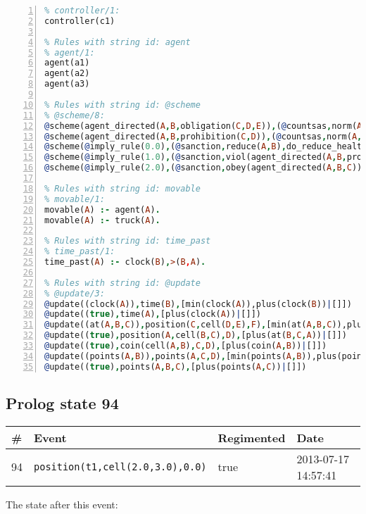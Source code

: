 \documentclass[11pt]{article}\usepackage[utf8]{inputenc}\usepackage{geometry}
\begin{document}
\begin{lstlisting}[language=Prolog, numbers=left]
% Rules with string id: controller
% controller/1:
controller(c1)

% Rules with string id: agent
% agent/1:
agent(a1)
agent(a2)
agent(a3)

% Rules with string id: @scheme
% @scheme/8:
@scheme(agent_directed(A,B,obligation(C,D,E)),(@countsas,norm(A,B,F,obligation(C,D,E)),F),false,(listTrue(C)),(time_past(D)),false,[plus(viol(agent_directed(A,B,obligation(C,D,E))))|[]],[plus(obey(agent_directed(A,B,obligation(C,D,E))))|[]])
@scheme(agent_directed(A,B,prohibition(C,D)),(@countsas,norm(A,B,E,prohibition(C,D)),E),(listTrue(C)),false,(false),false,[plus(viol(agent_directed(A,B,prohibition(C,D))))|[]],[plus(obey(agent_directed(A,B,prohibition(C,D))))|[]])
@scheme(@imply_rule(0.0),(@sanction,reduce(A,B),do_reduce_health(A,B),notifyAgent(A,changed(status))),true,false,false,false,[min(reduce(A,B))|[]],[])
@scheme(@imply_rule(1.0),(@sanction,viol(agent_directed(A,B,prohibition(C,D))),do_sanction(D)),true,false,false,false,[min(viol(agent_directed(A,B,prohibition(C,D))))|[]],[])
@scheme(@imply_rule(2.0),(@sanction,obey(agent_directed(A,B,C))),true,false,false,false,[min(obey(agent_directed(A,B,C)))|[]],[])

% Rules with string id: movable
% movable/1:
movable(A) :- agent(A).
movable(A) :- truck(A).

% Rules with string id: time_past
% time_past/1:
time_past(A) :- clock(B),>(B,A).

% Rules with string id: @update
% @update/3:
@update((clock(A)),time(B),[min(clock(A)),plus(clock(B))|[]])
@update((true),time(A),[plus(clock(A))|[]])
@update((at(A,B,C)),position(C,cell(D,E),F),[min(at(A,B,C)),plus(at(D,E,C))|[]])
@update((true),position(A,cell(B,C),D),[plus(at(B,C,A))|[]])
@update((true),coin(cell(A,B),C,D),[plus(coin(A,B))|[]])
@update((points(A,B)),points(A,C,D),[min(points(A,B)),plus(points(A,D))|[]])
@update((true),points(A,B,C),[plus(points(A,C))|[]])

\end{lstlisting}
\clearpage 
\subsection{Prolog state 94}
\begin{table}[ht]
\centering 
\begin{tabular}{l l l l} 
\textbf{\#} & \textbf{Event} & \textbf{Regimented} & \textbf{Date} \\ [0.5ex] 
\hline
94&\texttt{position(t1,cell(2.0,3.0),0.0)}&true&2013-07-17 14:57:41\\ [1ex] \hline\end{tabular}
\end{table}
The state after this event:
\end{document}
